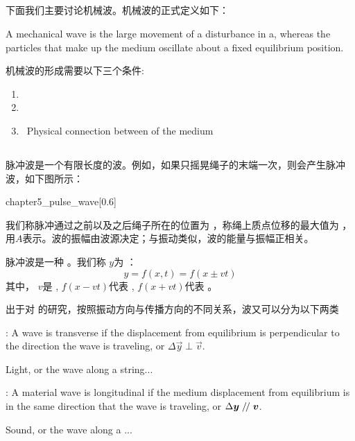 \subsection[机械波]{}
下面我们主要讨论机械波。机械波的正式定义如下：
\begin{Itemize}
    \item A mechanical wave is the large movement of a disturbance in a, whereas the particles that make up the medium oscillate about a fixed equilibrium position.
\end{Itemize}

机械波的形成需要以下三个条件:
\begin{enumerate}
    \item {}
    \item {}
    \item \ Physical connection between  of the medium
\end{enumerate}
\subsection[脉冲波]{}
脉冲波是一个有限长度的波。例如，如果只摇晃绳子的末端一次，则会产生脉冲波，如下图所示：
\begin{singlefigure}{chapter5_pulse_wave}[0.6]
\end{singlefigure}
我们称脉冲通过之前以及之后绳子所在的位置为 ，称绳上质点位移的最大值为 ，用$A$表示。波的振幅由波源决定；与振动类似，波的能量与振幅正相关。

脉冲波是一种 。我们称  $y$为 ：
\[y=f(x,t)=f(x \pm vt)\]
其中， $v$是 , $f(x - vt)$代表 , $f(x + vt)$代表 。

出于对  的研究，按照振动方向与传播方向的不同关系，波又可以分为以下两类
\begin{Itemize}
    \item {}: A wave is transverse if the displacement from equilibrium is perpendicular to the direction the wave is traveling, or $\Delta\vec{y}\perp \vec{v}$.\par
    \quad \quad \eg Light, or the wave along a string...
    \item {}: A material wave is longitudinal if the medium displacement from equilibrium is in the same direction that the wave is traveling, or $\Delta\vec{y}\mathrel{/\mskip-2.5mu/} \vec{v}$.\par
    \quad \quad \eg Sound, or the wave along a ...
\end{Itemize}\par
